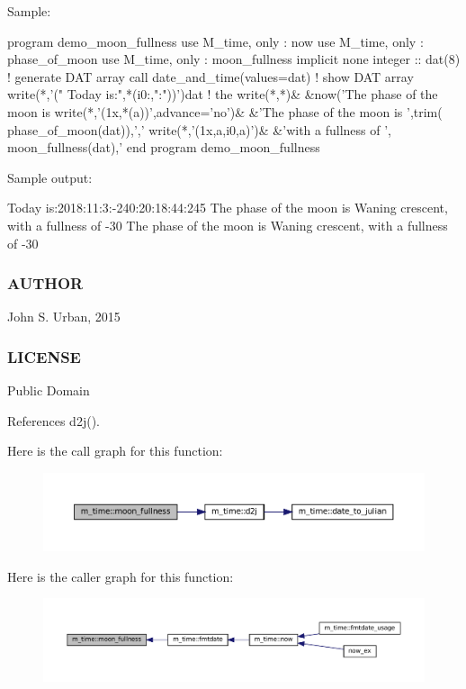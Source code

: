 \begin{DoxyVerb}Sample:

 program demo_moon_fullness
 use M_time, only : now
 use M_time, only : phase_of_moon
 use M_time, only : moon_fullness
 implicit none
 integer             :: dat(8)
    ! generate DAT array
    call date_and_time(values=dat)
    ! show DAT array
    write(*,'(" Today is:",*(i0:,":"))')dat
    ! the %
    write(*,*)&
    &now('The phase of the moon is %
    write(*,'(1x,*(a))',advance='no')&
    &'The phase of the moon is ',trim( phase_of_moon(dat)),','
    write(*,'(1x,a,i0,a)')&
    &'with a fullness of ', moon_fullness(dat),'%
 end program demo_moon_fullness

Sample output:

  Today is:2018:11:3:-240:20:18:44:245
  The phase of the moon is Waning crescent, with a fullness of -30%
  The phase of the moon is Waning crescent, with a fullness of -30%
\end{DoxyVerb}
 \subsubsection*{A\+U\+T\+H\+OR}

John S. Urban, 2015 \subsubsection*{L\+I\+C\+E\+N\+SE}

Public Domain 

References d2j().

Here is the call graph for this function\+:\nopagebreak
\begin{figure}[H]
\begin{center}
\leavevmode
\includegraphics[width=350pt]{namespacem__time_a702b39998a769b8f60070c0bec975ee2_cgraph}
\end{center}
\end{figure}
Here is the caller graph for this function\+:\nopagebreak
\begin{figure}[H]
\begin{center}
\leavevmode
\includegraphics[width=350pt]{namespacem__time_a702b39998a769b8f60070c0bec975ee2_icgraph}
\end{center}
\end{figure}
\mbox{\label{namespacem__time_a6b5e87be0e510ff268c1ecfbf67a3bdb}} 
